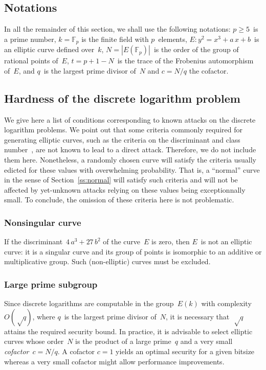 \documentclass[twocolumn,letterpaper]{article}
\def\F{\mathbb{F}}
\def\abs#1{\left|#1\right|}
\begin{document}
\subsection*{Notations}
In all the remainder of this section,
we shall use the following notations:
$p ≥ 5$~is a prime number,
$k = \F_{p}$ is the finite field with $p$~elements,
$E: y^2 = x^3 + a\,x + b$~is an elliptic curve defined over~$k$,
$N = \abs{E(\F_p)}$~is the order of the group of rational points of~$E$,
$t = p + 1 - N$~is the trace of the Frobenius automorphism of~$E$,
and $q$~is the largest prime divisor of~$N$ and $c = N/q$ the cofactor.

\subsection{Hardness of the discrete logarithm problem}
\label{ss:dlp}

We give here a list of conditions corresponding to
known attacks on the discrete logarithm problems.
We point out that some criteria commonly required
for generating elliptic curves,
such as the criteria on the discriminant and class number~\cite{rfc5639},
are not known to lead to a direct attack.
Therefore, we do not include them here.
Nonetheless, a randomly chosen curve will satisfy the
criteria usually edicted for these values with overwhelming probability.
That is, a “normal” curve in the sense of Section~\ref{ss:normal}
will satisfy such criteria and will not be affected by yet-unknown
attacks relying on these values being exceptionnally small.
To conclude, the omission of these criteria here is not problematic.

\subsubsection{Nonsingular curve}

If the discriminant~$4\, a^3 + 27\,b^2$
of the curve~$E$ is zero, then $E$~is not an elliptic curve:
it is a singular curve and its group of points is isomorphic to
an additive or multiplicative group.
Such (non-elliptic) curves must be excluded.

\subsubsection{Large prime subgroup}

Since discrete logarithms are computable in the group~$E(k)$
with complexity~$O(√q)$, where $q$~is the largest prime divisor of~$N$,
it is necessary that~$√q$ attains the required security bound.
In practice, it is advisable to select elliptic curves whose order~$N$
is the product of a large prime~$q$
and a very small \emph{cofactor}~$c = N/q$.
A cofactor $c = 1$ yields an optimal security for a given bitsize
whereas a very small cofactor might allow performance improvements.
\end{document}
